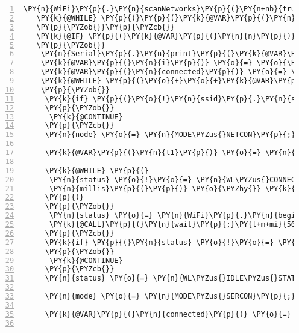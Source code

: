 \begin{Verbatim}[commandchars=\\\{\},numbers=left,firstnumber=1,stepnumber=1,frame=leftline,numbersep=0pt]
   \PY{n}{WiFi}\PY{p}{.}\PY{n}{scanNetworks}\PY{p}{(}\PY{n+nb}{true}\PY{p}{)}\PY{p}{;}
   \PY{k}{@WHILE} \PY{p}{(}\PY{p}{(}\PY{k}{@VAR}\PY{p}{(}\PY{n}{n}\PY{p}{)} \PY{o}{=} \PY{n}{WiFi}\PY{p}{.}\PY{n}{scanComplete}\PY{p}{(}\PY{p}{)}\PY{p}{)} \PY{o}{=}\PY{o}{=} \PY{n}{WIFI\PYZus{}SCAN\PYZus{}RUNNING}\PY{p}{)}
   \PY{p}{\PYZob{}}\PY{p}{\PYZcb{}}
   \PY{k}{@IF} \PY{p}{(}\PY{k}{@VAR}\PY{p}{(}\PY{n}{n}\PY{p}{)} \PY{o}{\PYZgt{}} \PY{l+m+mi}{0}\PY{p}{)}
   \PY{p}{\PYZob{}}
    \PY{n}{Serial}\PY{p}{.}\PY{n}{print}\PY{p}{(}\PY{k}{@VAR}\PY{p}{(}\PY{n}{n}\PY{p}{)}\PY{p}{)}\PY{p}{;}
    \PY{k}{@VAR}\PY{p}{(}\PY{n}{i}\PY{p}{)} \PY{o}{=} \PY{o}{\PYZhy{}}\PY{l+m+mi}{1}\PY{p}{;}
    \PY{k}{@VAR}\PY{p}{(}\PY{n}{connected}\PY{p}{)} \PY{o}{=} \PY{n+nb}{false}\PY{p}{;}
    \PY{k}{@WHILE} \PY{p}{(}\PY{o}{+}\PY{o}{+}\PY{k}{@VAR}\PY{p}{(}\PY{n}{i}\PY{p}{)} \PY{o}{\PYZlt{}} \PY{k}{@VAR}\PY{p}{(}\PY{n}{n}\PY{p}{)}\PY{p}{)}
    \PY{p}{\PYZob{}}     
     \PY{k}{if} \PY{p}{(}\PY{o}{!}\PY{n}{ssid}\PY{p}{.}\PY{n}{startsWith}\PY{p}{(}\PY{n}{fbcp}\PY{o}{:}\PY{o}{:}\PY{n}{BOARD\PYZus{}PREFIX}\PY{p}{)}\PY{p}{)}
     \PY{p}{\PYZob{}}
      \PY{k}{@CONTINUE}
     \PY{p}{\PYZcb{}}
     \PY{n}{node} \PY{o}{=} \PY{n}{MODE\PYZus{}NETCON}\PY{p}{;}
     
     \PY{k}{@VAR}\PY{p}{(}\PY{n}{t1}\PY{p}{)} \PY{o}{=} \PY{n}{millis}\PY{p}{(}\PY{p}{)}\PY{p}{;}

     \PY{k}{@WHILE} \PY{p}{(}
      \PY{n}{status} \PY{o}{!}\PY{o}{=} \PY{n}{WL\PYZus{}CONNECTED} \PY{o}{\PYZam{}}\PY{o}{\PYZam{}}
      \PY{n}{millis}\PY{p}{(}\PY{p}{)} \PY{o}{\PYZhy{}} \PY{k}{@VAR}\PY{p}{(}\PY{n}{t1}\PY{p}{)} \PY{o}{\PYZlt{}} \PY{n}{fbcp}\PY{o}{:}\PY{o}{:}\PY{n}{HARD\PYZus{}TIMEOUT}
     \PY{p}{)}
     \PY{p}{\PYZob{}}
      \PY{n}{status} \PY{o}{=} \PY{n}{WiFi}\PY{p}{.}\PY{n}{begin}\PY{p}{(}\PY{n}{ssid}\PY{p}{.}\PY{n}{c\PYZus{}str}\PY{p}{(}\PY{p}{)}\PY{p}{)}\PY{p}{;}
      \PY{k}{@CALL}\PY{p}{(}\PY{n}{wait}\PY{p}{;}\PY{l+m+mi}{500}\PY{p}{)}\PY{o}{:}\PY{n}{null}\PY{p}{;}
     \PY{p}{\PYZcb{}}
     \PY{k}{if} \PY{p}{(}\PY{n}{status} \PY{o}{!}\PY{o}{=} \PY{n}{WL\PYZus{}CONNECTED}\PY{p}{)}
     \PY{p}{\PYZob{}}
      \PY{k}{@CONTINUE}
     \PY{p}{\PYZcb{}}
     \PY{n}{status} \PY{o}{=} \PY{n}{WL\PYZus{}IDLE\PYZus{}STATUS}\PY{p}{;}

     \PY{n}{mode} \PY{o}{=} \PY{n}{MODE\PYZus{}SERCON}\PY{p}{;}

     \PY{k}{@VAR}\PY{p}{(}\PY{n}{connected}\PY{p}{)} \PY{o}{=} \PY{n}{sockOut}\PY{p}{.}\PY{n}{connect}\PY{p}{(}\PY{n}{gateway}\PY{p}{,} \PY{n}{FBNet}\PY{o}{:}\PY{o}{:}\PY{n}{PORT}\PY{p}{)}\PY{p}{;}
      

\end{Verbatim}
